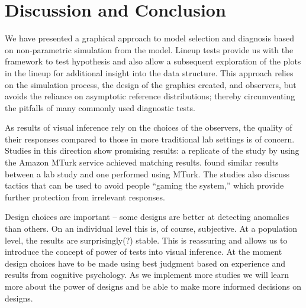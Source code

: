 \documentclass[12pt]{article} %
\newcommand{\hh}[1]{{\color{orange} #1}}
\newcommand{\hhnote}[1]{\todo[inline,color=orange!40]{#1}}
\begin{document}
\section{Discussion and Conclusion}\label{sec:conclusion}

We have presented a graphical approach to model selection and diagnosis based on non-parametric simulation from the model. %
Lineup tests provide us with the framework to test hypothesis and also allow a  subsequent exploration of the plots in the lineup  for additional insight into the data structure. This approach relies  on the simulation process, the design of the graphics created, and observers, but avoids the reliance on asymptotic reference distributions; thereby circumventing the pitfalls of many commonly used diagnostic tests. 



As results of visual inference rely on the choices of the observers,  the quality of their responses compared to those in more traditional lab settings is  of concern. Studies in this direction show promising results: a replicate of the  study by \citet{cleveland:1984} using the Amazon MTurk service \cite{heer:2010} achieved matching results. \cite{kosara:2010} found similar results between a lab study and one performed using MTurk. The studies also discuss tactics that can be used to avoid people ``gaming the system,'' which provide further protection from irrelevant responses.

\hh{Design choices are important -- some designs are better at detecting anomalies than others. On an individual level this is, of course, subjective. At a population level, the results are surprisingly(?) stable. This is reassuring and allows us to introduce the concept of power of tests into visual inference. At the moment design choices have to be made using best judgment based on  experience and results from cognitive psychology. As we implement more studies we will learn more about the power of designs and be able to make more informed decisions on designs.
}
\end{document}
